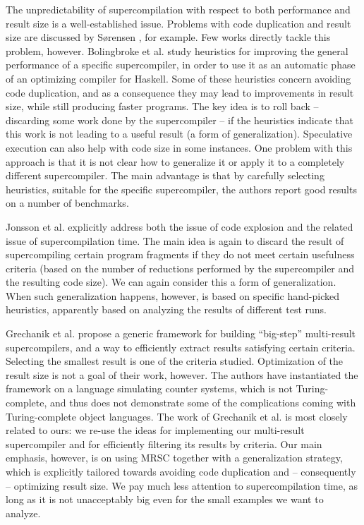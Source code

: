 \documentclass[submission,copyright,creativecommons]{eptcs}
\begin{document}
The unpredictability of supercompilation with respect to both performance and
result size is a well-established issue.
Problems with code duplication and result size are discussed by S{\o}rensen \cite{Sorensen1994TurchinSupercompiler}, 
for example.
Few works directly tackle this problem, however.
Bolingbroke et al. \cite{bolingbroke2011improving} study heuristics for improving the general
performance of a specific supercompiler, in order to use it as an automatic phase of an optimizing 
compiler for Haskell.
Some of these heuristics concern avoiding code duplication, and as a consequence they may
lead to improvements in result size, while still producing faster programs.
The key idea is to roll back -- discarding some work done by the supercompiler -- if the heuristics
indicate that this work is not leading to a useful result (a form of generalization).
Speculative execution can also help with code size in some instances.
One problem with this approach is that it is not clear how to generalize it or
apply it to a completely different supercompiler.
The main advantage is that by carefully selecting heuristics, suitable for the specific
supercompiler, the authors report good results on a number of benchmarks.

Jonsson et al. \cite{Jonsson2011Taming} explicitly address both the issue of code explosion and
the related issue of supercompilation time.
The main idea is again to discard the result of supercompiling certain program fragments
if they do not meet certain usefulness criteria (based on the number of reductions performed 
by the supercompiler and the resulting code size).
We can again consider this a form of generalization.
When such generalization happens, however, is based on specific hand-picked heuristics,
apparently based on analyzing the results of different test runs.

Grechanik et al. \cite{Romanenko2014StagedMRSC} propose a generic framework for building ``big-step''
multi-result supercompilers, and a way to efficiently extract results satisfying certain criteria.
Selecting the smallest result is one of the criteria studied.
Optimization of the result size is not a goal of their work, however.
The authors have instantiated the framework on a language simulating counter systems, which
is not Turing-complete, and thus does not demonstrate some of the complications
coming with Turing-complete object languages.
The work of Grechanik et al. \cite{Romanenko2014StagedMRSC} is most closely related to ours: 
we re-use the ideas for implementing
our multi-result supercompiler and for efficiently filtering its results by criteria.
Our main emphasis, however, is on using MRSC together with a generalization strategy, which
is explicitly tailored towards avoiding code duplication and -- consequently -- optimizing result size.
We pay much less attention to supercompilation time, as long as it is not unacceptably big
even for the small examples we want to analyze.
\end{document}
